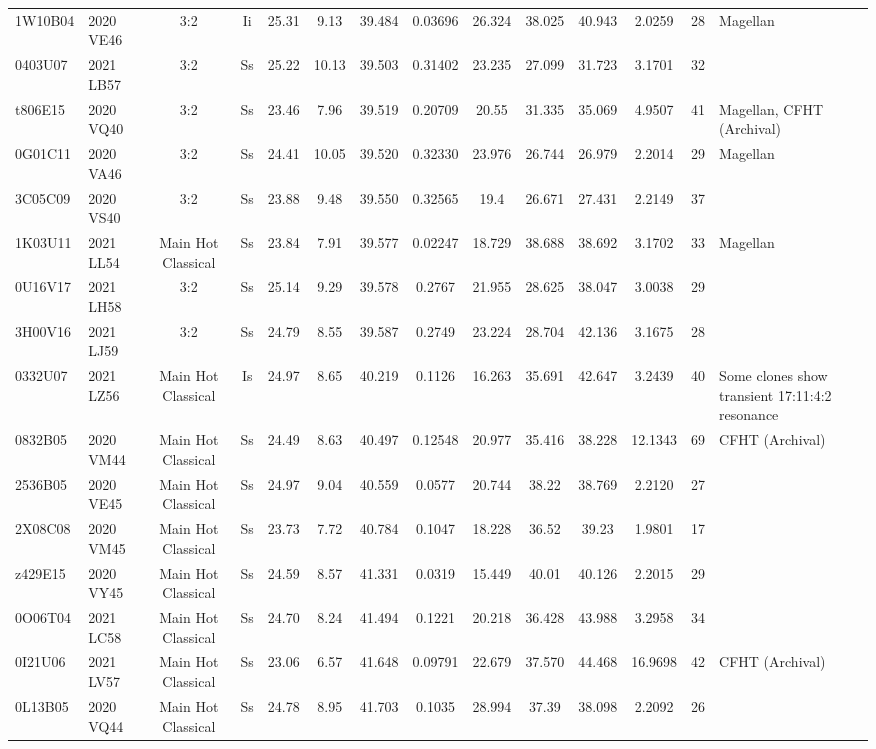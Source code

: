 \begin{longrotatetable}
\begin{longtable}{ll|ccccccccccc | l}
1W10B04 & 2020 VE46 & 3:2 & Ii & 25.31 & 9.13 & 39.484 & 0.03696 & 26.324 & 38.025 & 40.943 & 2.0259 & 28 & Magellan  \\ 
0403U07 & 2021 LB57 & 3:2 & Ss & 25.22 & 10.13 & 39.503 & 0.31402 & 23.235 & 27.099 & 31.723 & 3.1701 & 32 & \\ 
t806E15 & 2020 VQ40 & 3:2 & Ss & 23.46 & 7.96 & 39.519 & 0.20709 & 20.55 & 31.335 & 35.069 & 4.9507 & 41 & Magellan, CFHT (Archival)  \\ 
0G01C11 & 2020 VA46 & 3:2 & Ss & 24.41 & 10.05 & 39.520 & 0.32330 & 23.976 & 26.744 & 26.979 & 2.2014 & 29 & Magellan  \\ 
3C05C09 & 2020 VS40 & 3:2 & Ss & 23.88 & 9.48 & 39.550 & 0.32565 & 19.4 & 26.671 & 27.431 & 2.2149 & 37 & \\ 
1K03U11 & 2021 LL54 & Main Hot Classical & Ss & 23.84 & 7.91 & 39.577 & 0.02247 & 18.729 & 38.688 & 38.692 & 3.1702 & 33 & Magellan  \\ 
0U16V17 & 2021 LH58 & 3:2 & Ss & 25.14 & 9.29 & 39.578 & 0.2767 & 21.955 & 28.625 & 38.047 & 3.0038 & 29 & \\ 
3H00V16 & 2021 LJ59 & 3:2 & Ss & 24.79 & 8.55 & 39.587 & 0.2749 & 23.224 & 28.704 & 42.136 & 3.1675 & 28 & \\ 
0332U07 & 2021 LZ56 & Main Hot Classical & Is & 24.97 & 8.65 & 40.219 & 0.1126 & 16.263 & 35.691 & 42.647 & 3.2439 & 40 & Some clones show transient 17:11:4:2 resonance  \\ 
0832B05 & 2020 VM44 & Main Hot Classical & Ss & 24.49 & 8.63 & 40.497 & 0.12548 & 20.977 & 35.416 & 38.228 & 12.1343 & 69 & CFHT (Archival)  \\ 
2536B05 & 2020 VE45 & Main Hot Classical & Ss & 24.97 & 9.04 & 40.559 & 0.0577 & 20.744 & 38.22 & 38.769 & 2.2120 & 27 & \\ 
2X08C08 & 2020 VM45 & Main Hot Classical & Ss & 23.73 & 7.72 & 40.784 & 0.1047 & 18.228 & 36.52 & 39.23 & 1.9801 & 17 & \\ 
z429E15 & 2020 VY45 & Main Hot Classical & Ss & 24.59 & 8.57 & 41.331 & 0.0319 & 15.449 & 40.01 & 40.126 & 2.2015 & 29 & \\ 
0O06T04 & 2021 LC58 & Main Hot Classical & Ss & 24.70 & 8.24 & 41.494 & 0.1221 & 20.218 & 36.428 & 43.988 & 3.2958 & 34 & \\ 
0I21U06 & 2021 LV57 & Main Hot Classical & Ss & 23.06 & 6.57 & 41.648 & 0.09791 & 22.679 & 37.570 & 44.468 & 16.9698 & 42 & CFHT (Archival)  \\ 
0L13B05 & 2020 VQ44 & Main Hot Classical & Ss & 24.78 & 8.95 & 41.703 & 0.1035 & 28.994 & 37.39 & 38.098 & 2.2092 & 26 & \\ 

\end{longtable}
\end{longrotatetable}
